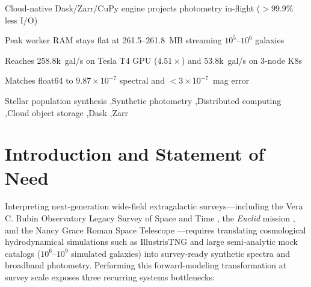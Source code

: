 \documentclass[preprint,12pt,authoryear]{elsarticle}
\begin{document}
\begin{frontmatter}
\begin{highlights}
\item Cloud-native Dask/Zarr/CuPy engine projects photometry in-flight ($>99.9\%$ less I/O)
\item Peak worker RAM stays flat at 261.5--261.8~MB streaming $10^5$--$10^6$ galaxies
\item Reaches 258.8k~gal/s on Tesla T4 GPU ($4.51\times$) and 53.8k~gal/s on 3-node K8s
\item Matches float64 to $9.87\times 10^{-7}$ spectral and $<3\times 10^{-7}$~mag error
\end{highlights}

\begin{keyword}
Stellar population synthesis \sep Synthetic photometry \sep Distributed computing \sep Cloud object storage \sep Dask \sep Zarr
\end{keyword}

\end{frontmatter}

\linenumbers

\section{Introduction and Statement of Need}
\label{sec:intro}

Interpreting next-generation wide-field extragalactic surveys---including the Vera C. Rubin Observatory Legacy Survey of Space and Time \citep[LSST;][]{ivezic2019lsst}, the \textit{Euclid} mission \citep{mellier2025euclid}, and the Nancy Grace Roman Space Telescope \citep{akeson2019wfirst}---requires translating cosmological hydrodynamical simulations such as IllustrisTNG \citep{pillepich2018simulating} and large semi-analytic mock catalogs ($10^6$--$10^9$ simulated galaxies) into survey-ready synthetic spectra and broadband photometry. Performing this forward-modeling transformation at survey scale exposes three recurring systems bottlenecks:
\end{document}
